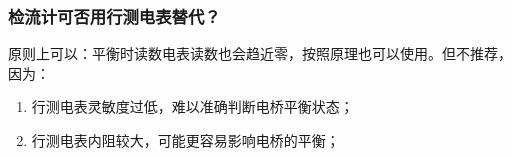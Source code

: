 \documentclass[]{../template/Report}%
\begin{document}
\begin{fullreportonly}
\subsubsection{检流计可否用行测电表替代？}
    原则上可以：平衡时读数电表读数也会趋近零，按照原理也可以使用。但不推荐，因为：
    \begin{enumerate}
      \item 行测电表灵敏度过低，难以准确判断电桥平衡状态；
      \item 行测电表内阻较大，可能更容易影响电桥的平衡；
    \end{enumerate}

\end{fullreportonly}
\insertnotes
\end{document}
